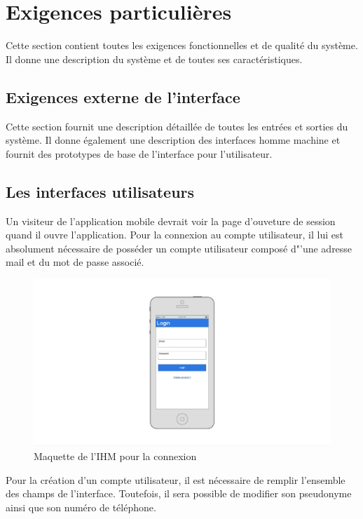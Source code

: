 \documentclass[titlepage, 12pt]{report}
\begin{document}
\chapter{Exigences particulières}

Cette section contient toutes les exigences fonctionnelles et de qualité du système. Il donne une description du système et de toutes ses caractéristiques.

\section{Exigences externe de l'interface}

Cette section fournit une description détaillée de toutes les entrées et sorties du système. Il donne également une description des interfaces homme machine et fournit des prototypes de base de l'interface pour l'utilisateur.

\section{Les interfaces utilisateurs}

Un visiteur de l'application mobile devrait voir la page d'ouveture de session quand il ouvre l'application. Pour la connexion au compte utilisateur, il lui est absolument nécessaire de posséder un compte utilisateur composé d"'une adresse mail et du mot de passe associé.

\begin{figure}[h]
	\caption{Maquette de l'IHM pour la connexion}
	\label{login}
	\centering
	\includegraphics[scale=0.2]{Images/mockups/login.png}
\end{figure}

Pour la création d'un compte utilisateur, il est nécessaire de remplir l'ensemble des champs de l'interface. Toutefois, il sera possible de modifier son pseudonyme ainsi que son numéro de téléphone.
\end{document}
